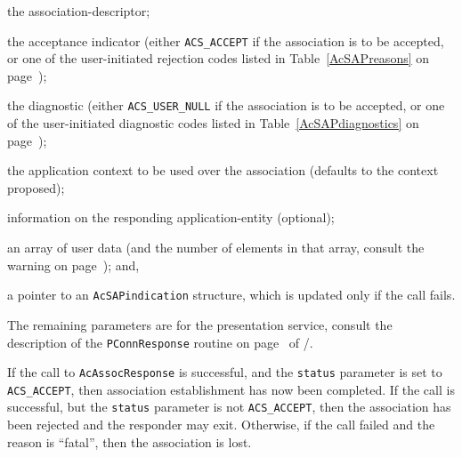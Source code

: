 \begin{describe}
\item[\verb"sd":] the association-descriptor;

\item[\verb"status":] the acceptance indicator
(either \verb"ACS_ACCEPT" if the association is to be accepted,
or one of the user-initiated rejection codes listed in
Table~\ref{AcSAPreasons} on page~\pageref{AcSAPreasons});

\item[\verb"reason":] the diagnostic
(either \verb"ACS_USER_NULL" if the association is to be accepted,
or one of the user-initiated diagnostic codes listed in
Table~\ref{AcSAPdiagnostics} on page~\pageref{AcSAPdiagnostics});

\item[\verb"context":] the application context to be used over the
association (defaults to the context proposed);

\item[\verb"respondtitle":] information on the responding application-entity
(optional);

\item[\verb"data"/\verb"ndata":] an array of user data
(and the number of elements in that array,
consult the warning on page~\pageref{AcSAPdata});
and,

\item[\verb"aci":] a pointer to an \verb"AcSAPindication" structure,
which is updated only if the call fails.
\end{describe}
The remaining parameters are for the presentation service,
consult the description of the \verb"PConnResponse" routine on
page~\pageref{PConnResponse} of \voltwo/.

If the call to \verb"AcAssocResponse" is successful,
and the \verb"status" parameter is set to \verb"ACS_ACCEPT",
then association establishment has now been completed.
If the call is successful,
but the \verb"status" parameter is not \verb"ACS_ACCEPT",
then the association has been rejected and the responder may exit.
Otherwise,
if the call failed and the reason is ``fatal'',
then the association is lost.

